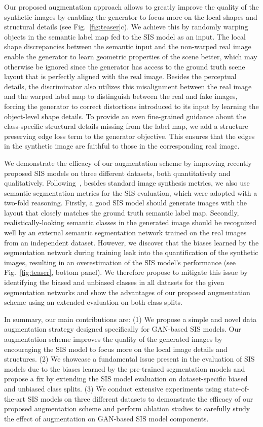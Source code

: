 \documentclass[final]{cvpr}
\newcommand\+{\mkern4mu}
\begin{document}
Our proposed augmentation approach allows to greatly improve the quality of the synthetic images by enabling the generator to focus more on the local shapes and structural details (see Fig.~\ref{fig:teaser}c). We achieve this by randomly warping objects in the semantic label map fed to the SIS model as an input. The local shape discrepancies between the semantic input and the non-warped real image enable the generator to learn geometric properties of the scene better, which may otherwise be ignored since the generator has access to the ground truth scene layout that is perfectly aligned with the real image. Besides the perceptual details, the discriminator also utilizes this misalignment between the real image and the warped label map to distinguish between the real and fake images, forcing the generator to correct distortions introduced to its input by learning the object-level shape details.
To provide an even fine-grained guidance about the class-specific structural details missing from the label map, we add a structure preserving edge loss term to the generator objective. This ensures that the edges in the synthetic image are faithful to those in the corresponding real image.

We demonstrate the efficacy of our augmentation scheme by improving recently proposed SIS models on three different datasets, both quantitatively and qualitatively. Following~\cite{isola2017image,wang2018high,park2019semantic}, besides standard image synthesis metrics, we also use semantic segmentation metrics for the SIS evaluation, which were adopted with a two-fold reasoning. Firstly, a good SIS model should generate images with the layout that closely matches the ground truth semantic label map. Secondly, realistically-looking semantic classes in the generated image should be recognized well by an external semantic segmentation network trained on the real images from an independent dataset. However, we discover that the biases learned by the segmentation network during training leak into the quantification of the synthetic images, resulting in an overestimation of the SIS model's performance (see Fig.~\ref{fig:teaser}, bottom panel). We therefore propose to mitigate this issue by identifying the biased and unbiased classes in all datasets for the given segmentation networks and show the advantages of our proposed augmentation scheme using an extended evaluation on both class splits.

In summary, our main contributions are:
(1) We propose a simple and novel data augmentation strategy designed specifically for GAN-based SIS models. Our augmentation scheme improves the quality of the generated images by encouraging the SIS model to focus more on the local image details and structures.
(2) We showcase a fundamental issue present in the evaluation of SIS models due to the biases learned by the pre-trained segmentation models and propose a fix by extending the SIS model evaluation on dataset-specific biased and unbiased class splits. 
(3) We conduct extensive experiments using state-of-the-art SIS models on three different datasets to demonstrate the efficacy of our proposed augmentation scheme and perform ablation studies to carefully study the effect of augmentation on GAN-based SIS model components. 
 	
\end{document}
